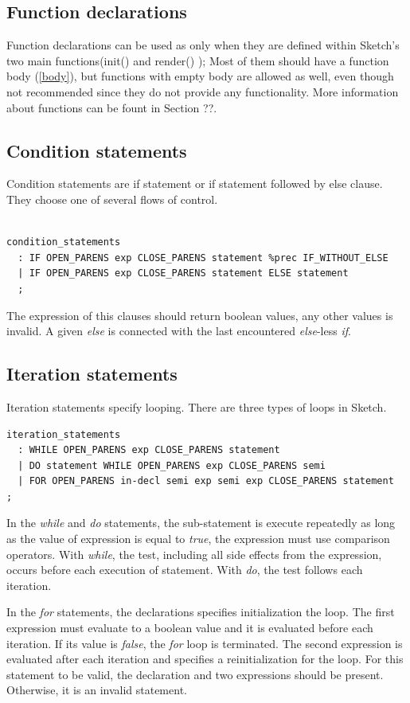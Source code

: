 \documentclass{l3proj}
\begin{document}
\subsection{Function declarations}
Function declarations can be used as only when they are defined within Sketch's two main functions(init() and render() ); Most of them should have a function body (\ref{body}), but functions with empty body are allowed as well, even though not recommended since they do not provide any functionality. More information about functions can be fount in Section ??.

\subsection{Condition statements} 
Condition statements are if statement or if statement followed by else clause.  They choose one of several flows of control.
\begin{lstlisting}

condition_statements  
  : IF OPEN_PARENS exp CLOSE_PARENS statement %prec IF_WITHOUT_ELSE
  | IF OPEN_PARENS exp CLOSE_PARENS statement ELSE statement 
  ;
\end{lstlisting}

The expression of this clauses should return boolean values, any other values is invalid. A given \textit{else} is connected with the last encountered \textit{else}-less \textit{if}. 

\subsection{Iteration statements}
Iteration statements specify looping. There are three types of loops in Sketch. 
\begin{lstlisting}
iteration_statements  
  : WHILE OPEN_PARENS exp CLOSE_PARENS statement
  | DO statement WHILE OPEN_PARENS exp CLOSE_PARENS semi
  | FOR OPEN_PARENS in-decl semi exp semi exp CLOSE_PARENS statement
;
\end{lstlisting}
In the \textit{while} and \textit{do} statements, the sub-statement is execute repeatedly as long as the value of expression is equal to \textit{true}, the expression must use comparison operators. With \textit{while}, the test, including all side effects from the expression, occurs before each execution of statement. With \textit{do}, the test follows each iteration. 

In the \textit{for} statements, the declarations specifies initialization the loop. The first expression must evaluate to a boolean value and it is evaluated before each iteration. If its value is \textit{false}, the \textit{for} loop is terminated. The second expression is evaluated after each iteration and specifies a reinitialization for the loop. For this statement to be valid, the declaration and two expressions should be present. Otherwise, it is an invalid statement. 
\end{document}
